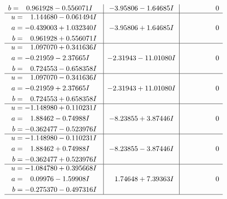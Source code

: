 \documentclass[1p]{elsarticle_modified}
\theoremstyle{definition}
\begin{document}
$$\begin{array}{c|c|c}
\begin{aligned}
b &= \phantom{-}0.961928 - 0.556071 I\end{aligned}
 & -3.95806 - 1.64685 I & \phantom{-0.000000 } 0 \\ \hline\begin{aligned}
u &= \phantom{-}1.144680 - 0.061494 I \\
a &= -0.439003 + 1.032340 I \\
b &= \phantom{-}0.961928 + 0.556071 I\end{aligned}
 & -3.95806 + 1.64685 I & \phantom{-0.000000 } 0 \\ \hline\begin{aligned}
u &= \phantom{-}1.097070 + 0.341636 I \\
a &= -0.21959 - 2.37665 I \\
b &= \phantom{-}0.724553 - 0.658358 I\end{aligned}
 & -2.31943 - 11.01080 I & \phantom{-0.000000 } 0 \\ \hline\begin{aligned}
u &= \phantom{-}1.097070 - 0.341636 I \\
a &= -0.21959 + 2.37665 I \\
b &= \phantom{-}0.724553 + 0.658358 I\end{aligned}
 & -2.31943 + 11.01080 I & \phantom{-0.000000 } 0 \\ \hline\begin{aligned}
u &= -1.148980 + 0.110231 I \\
a &= \phantom{-}1.88462 - 0.74988 I \\
b &= -0.362477 - 0.523976 I\end{aligned}
 & -8.23855 + 3.87446 I & \phantom{-0.000000 } 0 \\ \hline\begin{aligned}
u &= -1.148980 - 0.110231 I \\
a &= \phantom{-}1.88462 + 0.74988 I \\
b &= -0.362477 + 0.523976 I\end{aligned}
 & -8.23855 - 3.87446 I & \phantom{-0.000000 } 0 \\ \hline\begin{aligned}
u &= -1.084780 + 0.395668 I \\
a &= \phantom{-}0.09976 - 1.59908 I \\
b &= -0.275370 - 0.497316 I\end{aligned}
 & \phantom{-}1.74648 + 7.39363 I & \phantom{-0.000000 } 0\\
 \hline 
 \end{array}$$\newpage$$\begin{array}{c|c|c}  

\end{array}$$
\end{document}
